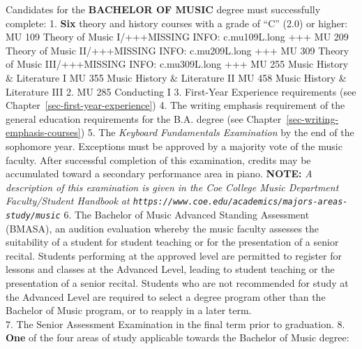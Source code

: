 \documentclass[
  letterpaper,
]{scrbook}
\begin{document}
Candidates for the \textbf{BACHELOR OF MUSIC} degree must successfully
complete: 1. \textbf{Six} theory and history courses with a grade of
``C'' (2.0) or higher: MU 109 Theory of Music I/+++MISSING INFO:
c.mu109L.long +++ MU 209 Theory of Music II/+++MISSING INFO:
c.mu209L.long +++ MU 309 Theory of Music III/+++MISSING INFO:
c.mu309L.long +++ MU 255 Music History \& Literature I MU 355 Music
History \& Literature II MU 458 Music History \& Literature III 2. MU
285 Conducting I 3. First-Year Experience requirements (see
Chapter~\ref{sec-first-year-experience}) 4. The writing emphasis
requirement of the general education requirements for the B.A. degree
(see Chapter~\ref{sec-writing-emphasis-courses}) 5. The \emph{Keyboard
Fundamentals Examination} by the end of the sophomore year. Exceptions
must be approved by a majority vote of the music faculty. After
successful completion of this examination, credits may be accumulated
toward a secondary performance area in piano. \textbf{NOTE:} \emph{A
description of this examination is given in the Coe College Music
Department Faculty/Student Handbook at
\texttt{https://www.coe.edu/academics/majors-areas-study/music}} 6. The
Bachelor of Music Advanced Standing Assessment (BMASA), an audition
evaluation whereby the music faculty assesses the suitability of a
student for student teaching or for the presentation of a senior
recital. Students performing at the approved level are permitted to
register for lessons and classes at the Advanced Level, leading to
student teaching or the presentation of a senior recital. Students who
are not recommended for study at the Advanced Level are required to
select a degree program other than the Bachelor of Music program, or to
reapply in a later term.\\
7. The Senior Assessment Examination in the final term prior to
graduation. 8. \textbf{One} of the four areas of study applicable
towards the Bachelor of Music degree:
\end{document}
